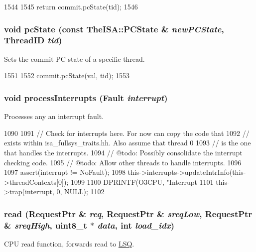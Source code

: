 \begin{DoxyCode}
1544 {
1545     return commit.pcState(tid);
1546 }
\end{DoxyCode}
\hypertarget{classFullO3CPU_a3b836956ac0c48ddf740167753bded14}{
\subsubsection[{pcState}]{\setlength{\rightskip}{0pt plus 5cm}void pcState (const TheISA::PCState \& {\em newPCState}, \/  {\bf ThreadID} {\em tid})}}
\label{classFullO3CPU_a3b836956ac0c48ddf740167753bded14}
Sets the commit PC state of a specific thread. 


\begin{DoxyCode}
1551 {
1552     commit.pcState(val, tid);
1553 }
\end{DoxyCode}
\hypertarget{classFullO3CPU_ac3b13f31ae4a2de2b647e09c37a10822}{
\subsubsection[{processInterrupts}]{\setlength{\rightskip}{0pt plus 5cm}void processInterrupts ({\bf Fault} {\em interrupt})}}
\label{classFullO3CPU_ac3b13f31ae4a2de2b647e09c37a10822}
Processes any an interrupt fault. 


\begin{DoxyCode}
1090 {
1091     // Check for interrupts here.  For now can copy the code that
1092     // exists within isa_fullsys_traits.hh.  Also assume that thread 0
1093     // is the one that handles the interrupts.
1094     // @todo: Possibly consolidate the interrupt checking code.
1095     // @todo: Allow other threads to handle interrupts.
1096 
1097     assert(interrupt != NoFault);
1098     this->interrupts->updateIntrInfo(this->threadContexts[0]);
1099 
1100     DPRINTF(O3CPU, "Interrupt %
1101     this->trap(interrupt, 0, NULL);
1102 }
\end{DoxyCode}
\hypertarget{classFullO3CPU_a0bdeb74163a7a4d65b7773897ef8eb09}{
\subsubsection[{read}]{ read ({\bf RequestPtr} \& {\em req}, \/  {\bf RequestPtr} \& {\em sreqLow}, \/  {\bf RequestPtr} \& {\em sreqHigh}, \/  uint8\_\-t $\ast$ {\em data}, \/  int {\em load\_\-idx})}}
\label{classFullO3CPU_a0bdeb74163a7a4d65b7773897ef8eb09}
CPU read function, forwards read to \hyperlink{classLSQ}{LSQ}. 


